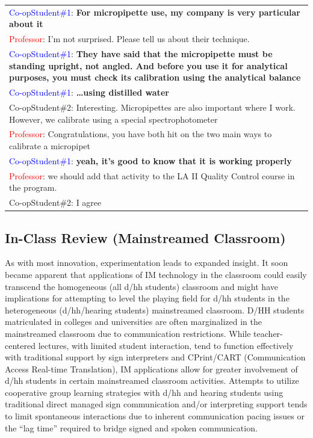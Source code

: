 \documentclass[11.5pt]{sig-alternate} %
\begin{document}
\begin{large}
\begin{table}[htbp]
\begin{tabular}{|l|}
\hline
\textcolor{blue}{Co-opStudent\#1}: \textbf{For micropipette use, my company is very particular about it} \\
\textcolor{red}{Professor}: I’m not surprised. Please tell us about their technique. \\
\textcolor{blue}{Co-opStudent\#1}: \textbf{They have said that the micropipette must be standing upright, not angled. And before you use it for analytical purposes, you must check its calibration using the analytical balance} \\
\textcolor{blue}{Co-opStudent\#1}: \textbf{…using distilled water} \\
\textcolor{green7}{Co-opStudent\#2}: Interesting. Micropipettes are also important where I work. However, we calibrate using a special spectrophotometer \\
\textcolor{red}{Professor}: Congratulations, you have both hit on the two main ways to calibrate a micropipet \\
\textcolor{blue}{Co-opStudent\#1}: \textbf{yeah, it’s good to know that it is working properly} \\
\textcolor{red}{Professor}: we should add that activity to the LA II Quality Control course in the program. \\
\textcolor{green7}{Co-opStudent\#2}: I agree \\ \hline
\end{tabular}
\end{table}

\subsection*{In-Class Review (Mainstreamed Classroom)}

As with most innovation, experimentation leads to expanded insight. It soon became apparent that applications of IM technology in the classroom could easily transcend the homogeneous (all d/hh students) classroom and might have implications for attempting to level the playing field for d/hh students in the heterogeneous (d/hh/hearing students) mainstreamed classroom. D/HH students matriculated in colleges and universities are often marginalized in the mainstreamed classroom due to communication restrictions. While teacher-centered lectures, with limited student interaction, tend to function effectively with traditional support by sign interpreters and CPrint/CART (Communication Access Real-time Translation), IM applications allow for greater involvement of d/hh students in certain mainstreamed classroom activities. Attempts to utilize cooperative group learning strategies with d/hh and hearing students using traditional direct managed sign communication and/or interpreting support tends to limit spontaneous interactions due to inherent communication pacing issues or the ``lag time'' required to bridge signed and spoken communication. 


\end{large}
\end{document}
